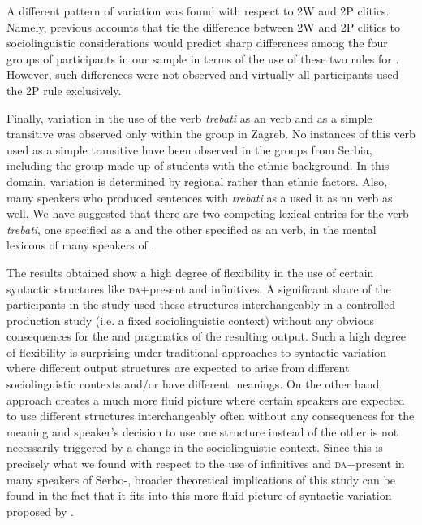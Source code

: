 \documentclass[output=paper,modfonts,newtxmath,hidelinks,]{langscibook}
\begin{document}
A different pattern of variation was found with respect to 2W and 2P clitics. Namely, previous accounts that tie the difference between 2W and 2P clitics to sociolinguistic considerations would predict sharp differences among the four groups of participants in our sample in terms of the use of these two rules for . However, such differences were not observed and virtually all participants used the 2P rule exclusively.\largerpage

Finally, variation in the use of the verb \textit{trebati} as an  verb and as a simple transitive was observed only within the group in Zagreb. No instances of this verb used as a simple transitive have been observed in the groups from Serbia, including the group made up of students with the  ethnic background. In this domain, variation is determined by regional rather than ethnic factors. Also, many speakers who produced sentences with \textit{trebati} as a  used it as an  verb as well. We have suggested that there are two competing lexical entries for the verb \textit{trebati}, one specified as a  and the other specified as an  verb, in the mental lexicons of many speakers of . 

The results obtained show a high degree of flexibility in the use of certain syntactic structures like \textsc{da}+present and infinitives. A significant share of the participants in the study used these structures interchangeably in a controlled production study (i.e. a fixed sociolinguistic context) without any obvious consequences for the  and pragmatics of the resulting output. Such a high degree of flexibility is surprising under traditional approaches to syntactic variation where different output structures are expected to arise from different sociolinguistic contexts and/or have different meanings. On the other hand,  approach creates a much more fluid picture where certain speakers are expected to use different structures interchangeably often without any consequences for the meaning and speaker’s decision to use one structure instead of the other is not necessarily triggered by a change in the sociolinguistic context. Since this is precisely what we found with respect to the use of infinitives and \textsc{da}+present in many speakers of Serbo-, broader theoretical implications of this study can be found in the fact that it fits into this more fluid picture of syntactic variation proposed by \citet{Adger2006}.
\end{document}
